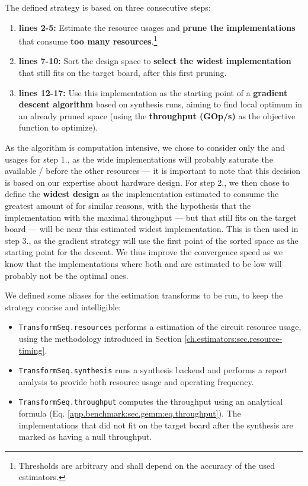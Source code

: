             The defined strategy is based on three consecutive steps:
            \begin{enumerate}
                \item {\bf lines 2-5:} Estimate the resource usages and {\bf prune the implementations} that consume {\bf too many resources}.\footnote{Thresholds are arbitrary and shall depend on the accuracy of the used estimators.}
                \item {\bf lines 7-10:} Sort the design space to {\bf select the widest implementation} that still fits on the target board, after this first pruning.
                \item {\bf lines 12-17:} Use this implementation as the starting point of a {\bf gradient descent algorithm} based on synthesis runs, aiming to find local optimum in an already pruned space (using the {\bf throughput (GOp/s)} as the objective function to optimize).
            \end{enumerate}

            As the  algorithm is computation intensive, we chose to consider only the  and  usages for step 1., as the wide implementations will probably saturate the available / before the other resources --- it is important to note that this decision is based on our expertise about hardware design.
            For step 2., we then chose to define the {\bf widest design} as the implementation estimated to consume the greatest amount of  for similar reasons, with the hypothesis that the implementation with the maximal throughput --- but that still fits on the target board --- will be near this estimated widest implementation.
            This is then used in step 3., as the gradient strategy will use the first point of the sorted space as the starting point for the descent.
            We thus improve the convergence speed as we know that the implementations where both  and  are estimated to be low will probably not be the optimal ones.

            We defined some aliases for the estimation transforms to be run, to keep the strategy concise and intelligible:
            \begin{itemize}
                \item \lstinline{TransformSeq.resources} performs a \firrtl{} estimation of the circuit resource usage, using the methodology introduced in Section \ref{ch.estimators:sec.resource-timing}.
                \item \lstinline{TransformSeq.synthesis} runs a synthesis backend and performs a report analysis to provide both resource usage and operating frequency.
                \item \lstinline{TransformSeq.throughput} computes the throughput using an analytical formula (Eq. \ref{app.benchmark:sec.gemm:eq.throughput}).
                    The implementations that did not fit on the target board after the synthesis are marked as having a null throughput.
            \end{itemize}

